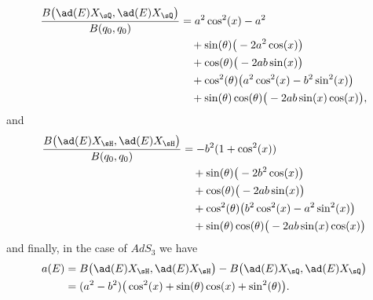 \begin{equation}            \label{LONGEqKillingEXQEXQ}
	\begin{aligned}[]
		\frac{ B\big( \ad(E)X_{\sQ},\ad(E)X_{\sQ} \big)}{B(q_0,q_0)} & =a^2\cos^2(x)-a^2                                              \\
		                                                             & \quad +\sin(\theta)\big( -2a^2\cos(x) \big)                    \\
		                                                             & \quad +\cos(\theta)\big( -2ab\sin(x) \big)                     \\
		                                                             & \quad +\cos^2(\theta)\big( a^2\cos^2(x)-b^2\sin^2(x) \big)     \\
		                                                             & \quad +\sin(\theta)\cos(\theta)\big( -2ab\sin(x)\cos(x) \big),
	\end{aligned}
\end{equation}
and
\begin{equation}
	\begin{aligned}[]
		\frac{ B\big( \ad(E)X_{\sH},\ad(E)X_{\sH} \big)}{B(q_0,q_0)} & = -b^2(1+\cos^2(x))                                           \\
		                                                             & \quad +\sin(\theta)\big( -2b^2\cos(x) \big)                   \\
		                                                             & \quad +\cos(\theta)\big( -2ab\sin(x) \big)                    \\
		                                                             & \quad +\cos^2(\theta)\big( b^2\cos^2(x)-a^2\sin^2(x) \big)    \\
		                                                             & \quad +\sin(\theta)\cos(\theta)\big( -2ab\sin(x)\cos(x) \big)
	\end{aligned}
\end{equation}
and finally, in the case of $AdS_3$ we have
\begin{equation}        \label{LONGEqaEdansAdsTrois}
	\begin{aligned}[]
		a(E) & =B\big( \ad(E)X_{\sH},\ad(E)X_{\sH} \big)-B\big( \ad(E)X_{\sQ},\ad(E)X_{\sQ} \big) \\
		     & =(a^2-b^2)\big( \cos^2(x)+\sin(\theta)\cos(x)+\sin^2(\theta) \big).
	\end{aligned}
\end{equation}

